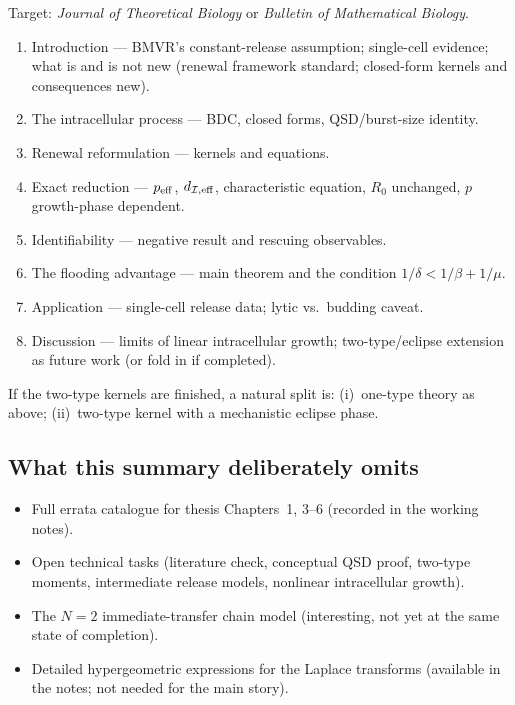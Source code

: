 \documentclass[11pt,a4paper]{article}
\newcommand{\Icell}{\mathcal{I}}
\theoremstyle{plain}
\theoremstyle{definition}
\theoremstyle{remark}
\begin{document}
Target: \textit{Journal of Theoretical Biology} or
\textit{Bulletin of Mathematical Biology}.

\begin{enumerate}
\item Introduction --- BMVR's constant-release assumption; single-cell evidence;
what is and is not new (renewal framework standard; closed-form kernels and
consequences new).
\item The intracellular process --- BDC, closed forms, QSD/burst-size identity.
\item Renewal reformulation --- kernels and equations.
\item Exact reduction --- $p_{\rm eff}$, $d_{\Icell,{\rm eff}}$, characteristic
equation, $R_0$ unchanged, $p$ growth-phase dependent.
\item Identifiability --- negative result and rescuing observables.
\item The flooding advantage --- main theorem and the condition
$1/\delta<1/\beta+1/\mu$.
\item Application --- single-cell release data; lytic vs.\ budding caveat.
\item Discussion --- limits of linear intracellular growth; two-type/eclipse
extension as future work (or fold in if completed).
\end{enumerate}

If the two-type kernels are finished, a natural split is: (i)~one-type theory as
above; (ii)~two-type kernel with a mechanistic eclipse phase.

\subsection{What this summary deliberately omits}

\begin{itemize}
\item Full errata catalogue for thesis Chapters~1, 3--6 (recorded in the working
notes).
\item Open technical tasks (literature check, conceptual QSD proof, two-type
moments, intermediate release models, nonlinear intracellular growth).
\item The $N=2$ immediate-transfer chain model (interesting, not yet at the same
state of completion).
\item Detailed hypergeometric expressions for the Laplace transforms (available
in the notes; not needed for the main story).
\end{itemize}
\end{document}
